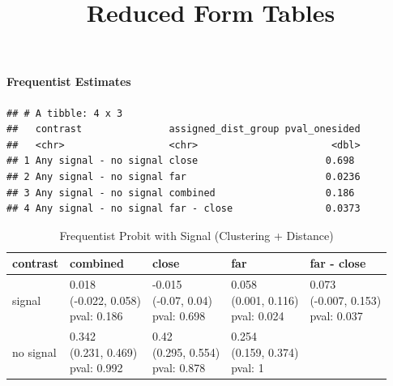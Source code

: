 \documentclass[
]{article}
\title{Reduced Form Tables}
\author{}
\date{\vspace{-2.5em}}
\begin{document}
\maketitle

\paragraph{Frequentist Estimates}\label{frequentist-estimates}

\begin{verbatim}
## # A tibble: 4 x 3
##   contrast               assigned_dist_group pval_onesided
##   <chr>                  <chr>                       <dbl>
## 1 Any signal - no signal close                      0.698 
## 2 Any signal - no signal far                        0.0236
## 3 Any signal - no signal combined                   0.186 
## 4 Any signal - no signal far - close                0.0373
\end{verbatim}

\begin{table}

\caption{\label{tab:signal-dist-estimates}Frequentist Probit with Signal (Clustering + Distance)}
\centering
\begin{tabular}[t]{l|l|l|l|l}
\hline
contrast & combined & close & far & far - close\\
\hline
signal & \makecell[c]{0.018\\(-0.022, 0.058)\\pval: 0.186} & \makecell[c]{-0.015\\(-0.07, 0.04)\\pval: 0.698} & \makecell[c]{0.058\\(0.001, 0.116)\\pval: 0.024} & \makecell[c]{0.073\\(-0.007, 0.153)\\pval: 0.037}\\
\hline
no signal & \makecell[c]{0.342\\(0.231, 0.469)\\pval: 0.992} & \makecell[c]{0.42\\(0.295, 0.554)\\pval: 0.878} & \makecell[c]{0.254\\(0.159, 0.374)\\pval: 1} & \\
\hline
\end{tabular}
\end{table}
\end{document}

